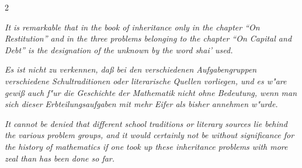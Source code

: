 \documentclass[10pt,a4paper]{article}
\newcommand{\enquote}[1]{``#1''}
\begin{document}
\begin{paracol}{2}
\switchcolumn

\textit{It is remarkable that in the book of inheritance only in the chapter \enquote{On Restitution} and in the three problems belonging to the chapter \enquote{On Capital and Debt} is the designation of the unknown by the word \textit{shai'} used.}

\switchcolumn*

\textit{Es ist nicht zu verkennen, da\ss{} bei den verschiedenen Aufgabengruppen verschiedene Schultraditionen oder literarische Quellen vorliegen, und es w"are gewi\ss{} auch f"ur die Geschichte der Mathematik nicht ohne Bedeutung, wenn man sich dieser Erbteilungsaufgaben mit mehr Eifer als bisher annehmen w"urde.}

\switchcolumn

\textit{It cannot be denied that different school traditions or literary sources lie behind the various problem groups, and it would certainly not be without significance for the history of mathematics if one took up these inheritance problems with more zeal than has been done so far.}

\end{paracol}

\clearpage
\end{document}
